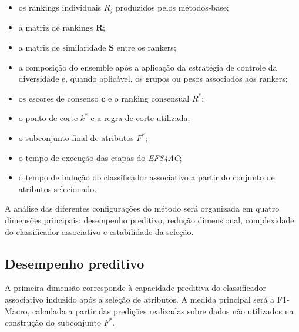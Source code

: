 \begin{itemize}

    \item os rankings individuais $R_j$ produzidos pelos métodos-base;

    \item a matriz de rankings $\mathbf{R}$;

    \item a matriz de similaridade $\mathbf{S}$ entre os rankers;

    \item a composição do ensemble após a aplicação da estratégia de controle
    da diversidade e, quando aplicável, os grupos ou pesos associados aos
    rankers;

    \item os escores de consenso $\mathbf{c}$ e o ranking consensual $R^{*}$;

    \item o ponto de corte $k^{*}$ e a regra de corte utilizada;

    \item o subconjunto final de atributos $F^{*}$;

    \item o tempo de execução das etapas do \textit{EFS4AC};

    \item o tempo de indução do classificador associativo a partir do conjunto
    de atributos selecionado.

\end{itemize}

A análise das diferentes configurações do método será organizada em quatro
dimensões principais: desempenho preditivo, redução dimensional, complexidade
do classificador associativo e estabilidade da seleção.


\subsection{Desempenho preditivo}
\label{subsec:ac-efs-avaliacao-preditiva}

A primeira dimensão corresponde à capacidade preditiva do classificador
associativo induzido após a seleção de atributos. A medida principal será a
F1-Macro, calculada a partir das predições realizadas sobre dados não
utilizados na construção do subconjunto $F^{*}$.

